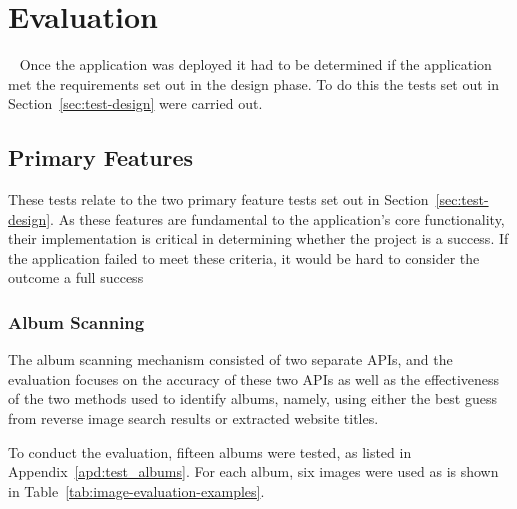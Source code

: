 \chapter{Evaluation}~\label{cha:evaluation}
Once the application was deployed it had to be determined if the application met the requirements set out in the design phase. To do this the tests set out in Section~\ref{sec:test-design} were carried out.

\section{Primary Features}
These tests relate to the two primary feature tests set out in Section~\ref{sec:test-design}. As these features are fundamental to the application's core functionality, their implementation is critical in determining whether the project is a success. If the application failed to meet these criteria, it would be hard to consider the outcome a full success

\subsection{Album Scanning}
The album scanning mechanism consisted of two separate APIs, and the evaluation focuses on the accuracy of these two APIs as well as the effectiveness of the two methods used to identify albums, namely, using either the best guess from reverse image search results or extracted website titles.

To conduct the evaluation, fifteen albums were tested, as listed in Appendix~\ref{apd:test_albums}. For each album, six images were used as is shown in Table~\ref{tab:image-evaluation-examples}.

